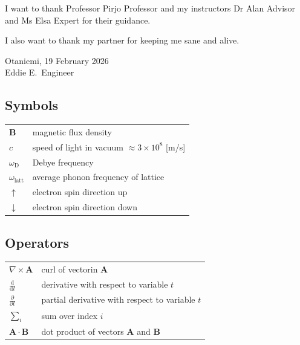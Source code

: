 \documentclass[english, 12pt, a4paper, sci, utf8, a-2b, online]{aaltothesis}
\begin{document}
\newpage

\dothesispagenumbering{}

I want to thank Professor Pirjo Professor and my instructors Dr Alan Advisor and
Ms Elsa Expert for their guidance.

I also want to thank my partner for keeping me sane and alive.

\vspace{5cm}
Otaniemi, 19 February 2026\\

\vspace{5mm}
{\hfill Eddie E.\ Engineer \hspace{1cm}}

\newpage


\thesistableofcontents



\subsection*{Symbols}

\begin{tabular}{ll}
$\mathbf{B}$  & magnetic flux density  \\
$c$              & speed of light in vacuum $\approx 3\times10^8$ [m/s]\\
$\omega_{\mathrm{D}}$    & Debye frequency \\
$\omega_{\mathrm{latt}}$ & average phonon frequency of lattice \\
$\uparrow$       & electron spin direction up\\
$\downarrow$     & electron spin direction down
\end{tabular}

\subsection*{Operators}

\begin{tabular}{ll}
$\nabla \times \mathbf{A}$              & curl of vectorin $\mathbf{A}$\\
$\displaystyle\frac{\mbox{d}}{\mbox{d} t}$ & derivative with respect to 
variable $t$\\[3mm]
$\displaystyle\frac{\partial}{\partial t}$  & partial derivative with respect 
to variable $t$ \\[3mm]
$\sum_i $                       & sum over index $i$\\
$\mathbf{A} \cdot \mathbf{B}$    & dot product of vectors $\mathbf{A}$ and 
$\mathbf{B}$
\end{tabular}
\end{document}

